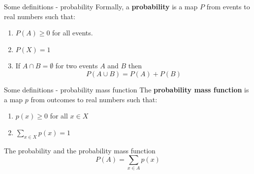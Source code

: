 \documentclass{beamer}
\newcommand{\crish}{\color{reddish}}
\newcommand{\cbla}{\color{black}}
\begin{document}
\begin{frame}{Some definitions - probability}
Formally, a \textbf{probability} is a map \crish$P$\cbla{}  from
events to real numbers such that:
\begin{enumerate}
\item \crish$P(A)\ge 0$\cbla{}  for all events.
\item \crish$P(X)=1$\cbla{} 
\item If \crish$A\cap B=\emptyset$\cbla{}  for two events \crish$A$\cbla{}  and \crish$B$\cbla{}  then 
\crish$$
P(A\cup B)=P(A)+P(B)
$$\cbla{}
\end{enumerate}
\end{frame}  

\begin{frame}{Some definitions - probability mass function}
The \textbf{probability mass function} is a map \crish$p$\cbla{}  from outcomes to real numbers such that:
\begin{enumerate}
\item \crish$p(x)\ge 0$\cbla{}  for all \crish$x\in X$\cbla{} 
\item \crish$\sum_{x\in X} p(x)=1$\cbla{} 
\end{enumerate}
\end{frame}

\begin{frame}{The probability and the probability mass function}
\crish$$
P(A)=\sum_{x\in A}p(x)
$$\cbla{}
\end{frame}

  
\end{document}
